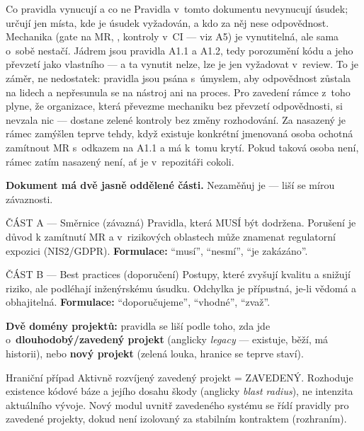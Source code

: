 \begin{callout}[amber]{Co pravidla vynucují a co ne}
Pravidla v~tomto dokumentu nevynucují úsudek; určují jen místa, kde je úsudek vyžadován, a kdo za něj nese odpovědnost.
Mechanika (gate na MR, , kontroly v~CI --- viz A5) je vynutitelná, ale sama o~sobě nestačí.
Jádrem jsou pravidla A1.1 a A1.2, tedy porozumění kódu a jeho převzetí jako vlastního --- a ta vynutit nelze, lze je jen vyžadovat v~review.
To je záměr, ne nedostatek: pravidla jsou psána s~úmyslem, aby odpovědnost zůstala na lidech a nepřesunula se na nástroj ani na proces.
Pro zavedení rámce z~toho plyne, že organizace, která převezme mechaniku bez převzetí odpovědnosti, si nevzala nic --- dostane zelené kontroly bez změny rozhodování.
Za nasazený je rámec zamýšlen teprve tehdy, když existuje konkrétní jmenovaná osoba ochotná zamítnout MR s~odkazem na A1.1 a má k~tomu krytí.
Pokud taková osoba není, rámec zatím nasazený není, ať je v~repozitáři cokoli.
\end{callout}

\medskip
\textbf{Dokument má dvě jasně oddělené části.}
Nezaměňuj je --- liší se mírou závaznosti.

\begin{callout}[light]{ČÁST A --- Směrnice (závazná)}
Pravidla, která MUSÍ být dodržena.
Porušení je důvod k zamítnutí MR a v~rizikových oblastech může znamenat regulatorní expozici (NIS2/GDPR).
\textbf{Formulace:} \enquote{musí}, \enquote{nesmí}, \enquote{je zakázáno}.
\end{callout}

\begin{callout}[green]{ČÁST B --- Best practices (doporučení)}
Postupy, které zvyšují kvalitu a snižují riziko, ale podléhají inženýrskému úsudku.
Odchylka je přípustná, je-li vědomá a obhajitelná.
\textbf{Formulace:} \enquote{doporučujeme}, \enquote{vhodné}, \enquote{zvaž}.
\end{callout}

\medskip
\textbf{Dvě domény projektů:} pravidla se liší podle toho, zda jde o~\textbf{dlouhodobý/zavedený projekt} (anglicky \emph{legacy} --- existuje, běží, má historii), nebo \textbf{nový projekt} (zelená louka, hranice se teprve staví).

\begin{callout}[amber]{Hraniční případ}
Aktivně rozvíjený zavedený projekt = ZAVEDENÝ.
Rozhoduje existence kódové báze a jejího dosahu škody (anglicky \emph{blast radius}), ne intenzita aktuálního vývoje.
Nový modul uvnitř zavedeného systému se řídí pravidly pro zavedené projekty, dokud není izolovaný za stabilním kontraktem (rozhraním).
\end{callout}

